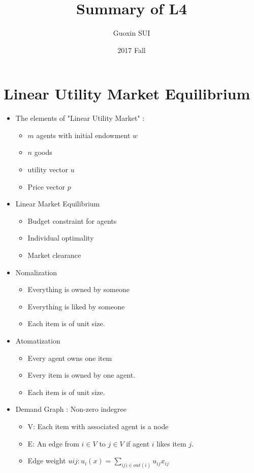 \documentclass{article}
\title{Summary of L4}
\author{Guoxin SUI}
\date{2017 Fall}
\begin{document}
\maketitle

\section{Linear Utility Market Equilibrium}
\begin{itemize}
  \item The elements of "Linear Utility Market" :
  \begin{itemize}
    \item $m$ agents with initial endowment $w$
    \item $n$ goods
    \item utility vector $u$
    \item Price vector $p$
  \end{itemize}

  \item Linear Market Equilibrium
  \begin{itemize}
    \item Budget constraint for agents
    \item Individual optimality
    \item Market clearance
  \end{itemize}

  \item Nomalization
  \begin{itemize}
    \item Everything is owned by someone
    \item Everything is liked by someone
    \item Each item is of unit size.
  \end{itemize}

  \item Atomatization
  \begin{itemize}
    \item Every agent owns one item
    \item Every item is owned by one agent.
    \item Each item is of unit size.
  \end{itemize}

  \item Demand Graph : Non-zero indegree
  \begin{itemize}
    \item V: Each item with associated agent is a node
    \item E: An edge from $i \in V$ to $j \in V$ if agent $i$ likes item $j$.
    \item Edge weight $u{ij} : u_i(x) = \sum_{ij)\in out(i)} u_{ij} x_{ij}$
  \end{itemize}

\end{itemize}
\end{document}

